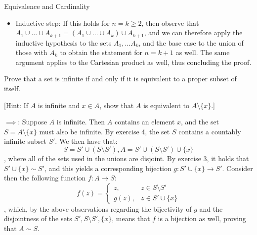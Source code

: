 \begin{section}{Equivalence and Cardinality}
\begin{solution}
\begin{itemize}
        $g$ is therefore a bijection, and thus $A_1 \times A_2 \sim \mathbb{N}$.

        If both $A_1, A_2$ are infinite, then consider the function $g: A_1 \times A_2 \rightarrow \mathbb{N}$:
        $$g(a_i, a_j') = 2^i(2j - 1)$$
        , which, because of the fact that $A_1 \sim \mathbb{N}, A_2 \sim \mathbb{N}$ (thus $i, j$ take all natural numbers as values), and by a proof completely analogous to $\mathbb{N} \times \mathbb{N} \rightarrow \mathbb{N}$ can be shown to be a bijection, thus proving that $A_1 \times A_2 \sim \mathbb{N}$.
        \item Inductive step: If this holds for $n = k \geq 2$, then observe that $A_1 \cup \ldots \cup A_{k+1} = (A_1 \cup \ldots \cup A_k) \cup A_{k+1}$, and we can therefore apply the inductive hypothesis to the sets $A_1, \ldots A_k$, and the base case to the union of those with $A_k$ to obtain the statement for $n = k+1$ as well.
        The same argument applies to the Cartesian product as well, thus concluding the proof.
    \end{itemize}

\end{solution}

\begin{exercise}{5}
    Prove that a set is infinite if and only if it is equivalent to a proper subset of itself.

    [Hint: If $A$ is infinite and $x \in A$, show that $A$ is equivalent to $A \setminus \{x\}.$]
\end{exercise}

\begin{solution}

    $\implies$: Suppose $A$ is infinite.
    Then $A$ contains an element $x$, and the set $S = A \setminus \{x\}$ must also be infinite.
    By exercise 4, the set $S$ contains a countably infinite subset $S'$.
    We then have that:
    $$S = S' \cup (S \setminus S'), A = S' \cup (S \setminus S') \cup \{x\}$$
    , where all of the sets used in the unions are disjoint.
    By exercise 3, it holds that $S' \cup \{x\} \sim S'$, and this yields a corresponding bijection $g: S' \cup \{x\} \rightarrow S'$.
    Consider then the following function $f: A \rightarrow S$:
    $$f(z) = \begin{cases}
        z,& z \in S \setminus S' \\
        g(z),& z \in S' \cup \{x\}
    \end{cases}$$
    , which, by the above observations regarding the bijectivity of $g$ and the disjointness of the sets $S', S \setminus S', \{x\}$, means that $f$ is a bijection as well, proving that $A \sim S$.
    

\end{solution}
\end{section}
